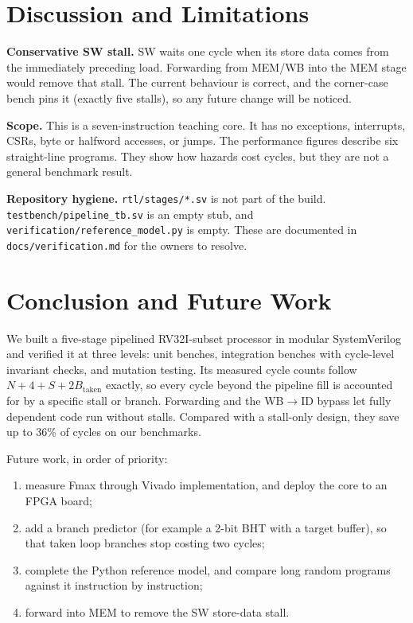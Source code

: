 \documentclass[conference]{IEEEtran}
\newcommand{\code}[1]{\texttt{\small #1}}
\begin{document}
\section{Discussion and Limitations}
\label{sec:disc}

\textbf{Conservative SW stall.} SW waits one cycle when its store data comes from the immediately preceding load. Forwarding from MEM/WB into the MEM stage would remove that stall. The current behaviour is correct, and the corner-case bench pins it (exactly five stalls), so any future change will be noticed.

\textbf{Scope.} This is a seven-instruction teaching core. It has no exceptions, interrupts, CSRs, byte or halfword accesses, or jumps. The performance figures describe six straight-line programs. They show how hazards cost cycles, but they are not a general benchmark result.

\textbf{Repository hygiene.} \code{rtl/stages/*.sv} is not part of the build. \code{testbench/pipeline\_tb.sv} is an empty stub, and \code{verification/reference\_model.py} is empty. These are documented in \code{docs/verification.md} for the owners to resolve.

\section{Conclusion and Future Work}
We built a five-stage pipelined RV32I-subset processor in modular SystemVerilog and verified it at three levels: unit benches, integration benches with cycle-level invariant checks, and mutation testing. Its measured cycle counts follow $N+4+S+2B_{\text{taken}}$ exactly, so every cycle beyond the pipeline fill is accounted for by a specific stall or branch. Forwarding and the WB$\rightarrow$ID bypass let fully dependent code run without stalls. Compared with a stall-only design, they save up to 36\% of cycles on our benchmarks.

Future work, in order of priority:
\begin{enumerate}
  \item measure Fmax through Vivado implementation, and deploy the core to an FPGA board;
  \item add a branch predictor (for example a 2-bit BHT with a target buffer), so that taken loop branches stop costing two cycles;
  \item complete the Python reference model, and compare long random programs against it instruction by instruction;
  \item forward into MEM to remove the SW store-data stall.
\end{enumerate}
\end{document}
